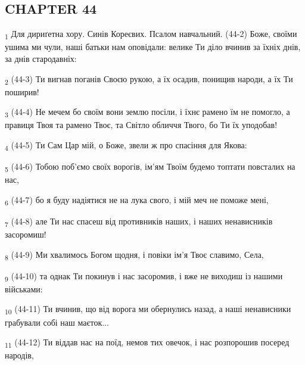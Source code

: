 \subsection{CHAPTER 44}
\begin{tcolorbox}
\textsubscript{1} Для дириґетна хору. Синів Кореєвих. Псалом навчальний. (44-2) Боже, своїми ушима ми чули, наші батьки нам оповідали: велике Ти діло вчинив за їхніх днів, за днів стародавніх:
\end{tcolorbox}
\begin{tcolorbox}
\textsubscript{2} (44-3) Ти вигнав поганів Своєю рукою, а їх осадив, понищив народи, а їх Ти поширив!
\end{tcolorbox}
\begin{tcolorbox}
\textsubscript{3} (44-4) Не мечем бо своїм вони землю посіли, і їхнє рамено їм не помогло, а правиця Твоя та рамено Твоє, та Світло обличчя Твого, бо Ти їх уподобав!
\end{tcolorbox}
\begin{tcolorbox}
\textsubscript{4} (44-5) Ти Сам Цар мій, о Боже, звели ж про спасіння для Якова:
\end{tcolorbox}
\begin{tcolorbox}
\textsubscript{5} (44-6) Тобою поб'ємо своїх ворогів, ім'ям Твоїм будемо топтати повсталих на нас,
\end{tcolorbox}
\begin{tcolorbox}
\textsubscript{6} (44-7) бо я буду надіятися не на лука свого, і мій меч не поможе мені,
\end{tcolorbox}
\begin{tcolorbox}
\textsubscript{7} (44-8) але Ти нас спасеш від противників наших, і наших ненависників засоромиш!
\end{tcolorbox}
\begin{tcolorbox}
\textsubscript{8} (44-9) Ми хвалимось Богом щодня, і повіки ім'я Твоє славимо, Села,
\end{tcolorbox}
\begin{tcolorbox}
\textsubscript{9} (44-10) та однак Ти покинув і нас засоромив, і вже не виходиш із нашими військами:
\end{tcolorbox}
\begin{tcolorbox}
\textsubscript{10} (44-11) Ти вчинив, що від ворога ми обернулись назад, а наші ненависники грабували собі наш маєток...
\end{tcolorbox}
\begin{tcolorbox}
\textsubscript{11} (44-12) Ти віддав нас на поїд, немов тих овечок, і нас розпорошив посеред народів,
\end{tcolorbox}
